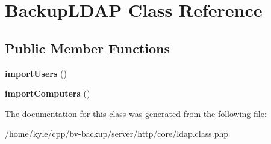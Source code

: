 \hypertarget{class_backup_l_d_a_p}{}\section{Backup\+L\+D\+AP Class Reference}
\label{class_backup_l_d_a_p}
\subsection*{Public Member Functions}
\begin{DoxyCompactItemize}
\item 
\mbox{\label{class_backup_l_d_a_p_a04cb372425b6cc6800a9a14f8bc55697}} 
{\bfseries import\+Users} ()
\item 
\mbox{\label{class_backup_l_d_a_p_a00034c4130b9d6b5c7c4a030b1436b80}} 
{\bfseries import\+Computers} ()
\end{DoxyCompactItemize}


The documentation for this class was generated from the following file\+:\begin{DoxyCompactItemize}
\item 
/home/kyle/cpp/bv-\/backup/server/http/core/ldap.\+class.\+php\end{DoxyCompactItemize}
